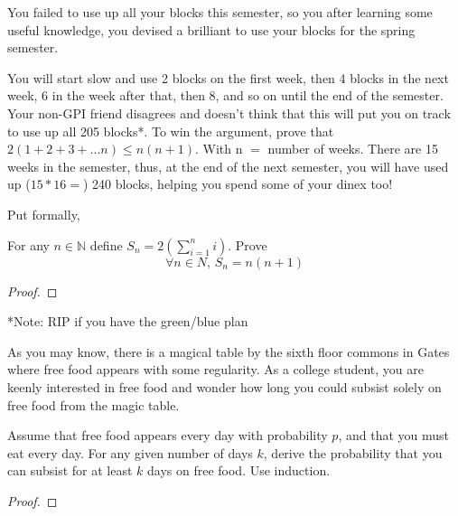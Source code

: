 \documentclass[11pt,largemargins]{homework}
\begin{document}
\maketitle

\question
You failed to use up all your blocks this semester, so you after learning some useful knowledge, you devised a brilliant to use your blocks for the spring semester. 

You will start slow and use 2 blocks on the first week, then 4 blocks in the next week, 6 in the week after that, then 8, and so on until the end of the semester. Your non-GPI friend disagrees and doesn't think that this will put you on track to use up all 205 blocks*. To win the argument, prove that $2(1+2+3+...n) \leq n(n+1)$. With n \(=\) number of weeks. There are 15 weeks in the semester, thus, at the end of the next semester, you will have used up (\(15*16 =\)) 240 blocks, helping you spend some of your dinex too! 

Put formally, 
\begin{center}
    For any \(n \in \mathbb{N}\) define \(S_n = 2(\sum_{i = 1}^{n}{i})\). Prove \[\forall n \in N, \, S_n = n(n+1)\]
\end{center}

\begin{proof}
\end{proof}	

*Note: RIP if you have the green/blue plan

\newpage

\question
As you may know, there is a magical table by the sixth floor commons in Gates where free food appears with some regularity. As a college student, you are keenly interested in free food and wonder how long you could subsist solely on free food from the magic table.

Assume that free food appears every day with probability \(p\), and that you must eat every day. For any given number of days \(k\), derive the probability that you can subsist for at least \(k\) days on free food. Use induction.

\begin{proof}
\end{proof}
\end{document}

